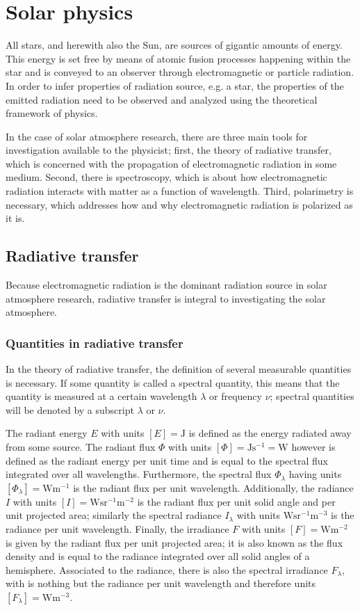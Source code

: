 \documentclass[a4paper,12pt]{report}
\def\lk#1{{\color{black}{#1}}}
\begin{document}
\chapter{Solar physics}
All stars, and herewith also the Sun, are sources of gigantic amounts of energy. This energy is set free by means of atomic fusion processes happening within the star and is conveyed to an observer through electromagnetic or particle radiation. In order to infer properties of \lk{a} radiation source, e.g. a star, the properties of the emitted radiation need to be observed and analyzed using the theoretical framework of physics. 

In the case of solar atmosphere research, there are three main tools for investigation available to the physicist; first, the theory of radiative transfer, which is concerned with the propagation of electromagnetic radiation in some medium. Second, there is spectroscopy, which is about how electromagnetic radiation interacts with matter as a function of wavelength. Third, polarimetry is necessary, which addresses how and why electromagnetic radiation is polarized as it is.

\section{Radiative transfer}
Because electromagnetic radiation is the dominant radiation source in solar atmosphere research, radiative transfer is integral to investigating the solar atmosphere.

\subsection{Quantities in radiative transfer}
In the theory of radiative transfer, the definition of several measurable quantities is necessary. If some quantity is called a spectral quantity, this means that the quantity is measured at a certain wavelength $\lambda$ or frequency $\nu$; spectral quantities will be denoted by a subscript $\lambda$ or $\nu$. 

The radiant energy $E$ with units $[E] = \si{\joule}$ is defined as the energy radiated away from some source. The radiant flux $\Phi$ with units $[\Phi] = \si{\joule\second^{-1}=\watt}$ however is defined as the radiant energy per unit time and is equal to the spectral flux integrated over all wavelengths. Furthermore, the spectral flux $\Phi_\lambda$ having units $[\Phi_\lambda] = \si{\watt\meter^{-1}}$ is the radiant flux per unit wavelength. Additionally, the radiance $I$ with units $[I]=\si{\watt\steradian^{-1}\meter^{-2}}$ is the radiant flux per unit solid angle and per unit projected area; similarly the spectral radiance $I_\lambda$ with units $\si{\watt\steradian^{-1}\meter^{-3}}$ is the radiance per unit wavelength. Finally, the irradiance $F$ with units $[F] = \si{\watt\meter^{-2}}$ is given by the radiant flux per unit projected area; it is also known as the flux density and is equal to the radiance integrated over all solid angles of a hemisphere. Associated to the radiance, there is also the spectral irradiance $F_{\lambda}$, with is nothing but the radiance per unit wavelength and therefore \lk{has} units $[F_{\lambda}]=\si{\watt\meter^{-3}}$.
\end{document}
